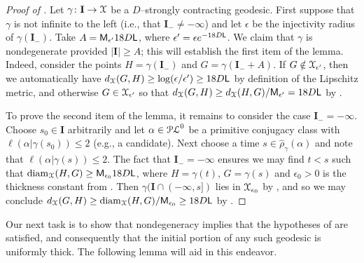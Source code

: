 \documentclass[letterpaper,fleqn]{article}
\theoremstyle{plain}
\theoremstyle{definition}
\DeclareMathOperator{\diam}{diam}
\newcommand{\abs}[1]{\left\vert#1\right\vert}
\newcommand{\pl}{{\EuScript{PL}}} %
\newcommand{\os}{{\EuScript X}} %
\newcommand{\plproj}{\pi_\pl} %
\newcommand{\len}{\ell}  %
\newcommand{\minlen}{m}  %
\newcommand{\minpts}{\rho} %
\newcommand{\mintime}{\hat{\minpts}} %
\newcommand{\sym}{{\sf M}} %
\newcommand{\lipconst}{{\sf L}} %
\renewcommand{\diam}{\mathrm{diam}}
\newcommand{\I}{\mathbf{I}}
\newcommand{\Imin}{\I_-}
\begin{document}
\begin{proof}[Proof of ]
Let $\gamma\colon\I\to\os$ be a $D$--strongly contracting geodesic. First suppose that $\gamma$ is not infinite to the left (i.e., that $\Imin\neq -\infty$) and let $\epsilon$ be the injectivity radius of $\gamma(\Imin)$. Take $A = \sym_{\epsilon'}18D\lipconst$, where $\epsilon' = \epsilon e^{-18D\lipconst}$. We claim that $\gamma$ is nondegenerate provided $\abs{\I}\ge A$; this will establish the first item of the lemma. Indeed, consider the points $H = \gamma(\Imin)$ and $G = \gamma(\Imin+A)$. If $G\notin \os_{\epsilon'}$, then we automatically have $d_\os(G,H)\ge \log(\epsilon/\epsilon')\ge 18D\lipconst$ by definition of the Lipschitz metric, and otherwise $G\in\os_{\epsilon'}$ so that $d_\os(G,H)\ge d_\os(H,G)/\sym_{\epsilon'} = 18D\lipconst$ by .

To prove the second item of the lemma, it remains to consider the case $\Imin = -\infty$. Choose $s_0\in \I$ arbitrarily and let $\alpha\in \pl^0$ be a primitive conjugacy class with $\len(\alpha\vert \gamma(s_0))\le 2$ (e.g., a candidate). Next choose a time $s\in \mintime_\gamma(\alpha)$ and note that $\len(\alpha\vert\gamma(s))\le 2$. The fact that $\Imin=-\infty$ ensures we may find $t< s$ such that $\diam_\os(H, G)\ge  \sym_{\epsilon_0}18D\lipconst$, where $H = \gamma(t)$, $G = \gamma(s)$ and  $\epsilon_0>0$ is the thickness constant from . Then $\gamma(\I\cap(-\infty,s])$ lies in $\os_{\epsilon_0}$ by , and so we may conclude $d_\os(G,H)\ge \diam_\os(H,G) / \sym_{\epsilon_0} \ge 18D\lipconst$ by .
\end{proof}

Our next task is to show that nondegeneracy implies that the hypotheses of  are satisfied, and consequently that the initial portion of any such geodesic is uniformly thick. The following lemma will aid in this endeavor.
\end{document}
